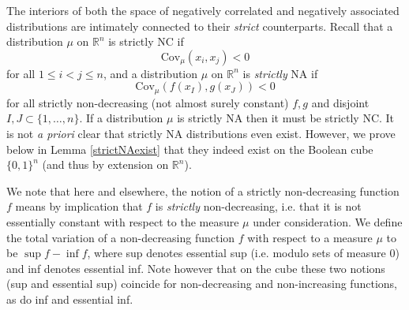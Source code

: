 \documentclass[11pt]{article}
\newcommand{\R}{\mathbb{R}}
\newcommand{\C}{\text{Cov}}
\begin{document}
The interiors of both the space of negatively correlated and negatively associated distributions are intimately connected to their {\it strict} counterparts.  Recall that a distribution $\mu$ on $\R^n$ is strictly NC if
\[
\C_{\mu}(x_i,x_j) <0
\]
for all $1\leq i< j \leq n$, and a distribution $\mu$ on $\R^n$ is {\it strictly} NA if 
\[
\C_{\mu}(f(x_I),g(x_J)) <0 
\]
for all strictly non-decreasing (not almost surely constant) $f,g$ and disjoint $I,J \subset\{1,\dots, n\}$. If a distribution $\mu$ is strictly NA then it must be strictly NC. It is not {\it a priori} clear that strictly NA distributions even exist. However, we prove below in Lemma \ref{strictNAexist} that they indeed exist on the Boolean cube $\{0,1\}^n$ (and thus by extension on $\R^n$).

We note that here and elsewhere, the notion of a strictly non-decreasing function $f$ means by implication that $f$ is {\it strictly} non-decreasing, i.e. that it is not essentially constant with respect to the measure $\mu$ under consideration. We define the total variation of a non-decreasing function $f$ with respect to a measure $\mu$ to be $\sup f -\inf f$, where sup denotes essential sup (i.e. modulo sets of measure 0) and inf denotes essential inf. Note however that on the cube these two notions (sup and essential sup) coincide for non-decreasing and non-increasing functions, as do inf and essential inf.
\end{document}
